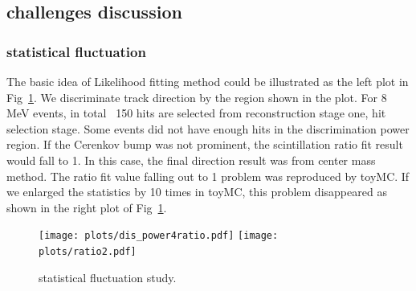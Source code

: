\documentclass[a4paper,10pt]{cpc-hepnp}
\begin{document}
\subsection{challenges discussion}
\subsubsection{statistical fluctuation}
The basic idea of Likelihood fitting method could be illustrated as the left plot
in Fig~\ref{dis_power}. We discriminate track direction by the region shown in
the plot. For 8 MeV events, in total ~150 hits are selected from reconstruction
stage one, hit selection stage. Some events did not have enough hits in the discrimination power
region. If the Cerenkov bump was not prominent, the scintillation ratio fit
result would fall to 1. In this case, the final direction result was from center mass
method. The ratio fit value falling out to 1 problem  was reproduced by toyMC. If we
enlarged the statistics by 10 times in toyMC, this problem disappeared as shown
in the right plot of Fig~\ref{dis_power}.
\begin{figure}[htbp]
\centering %
\texttt{[image: plots/dis\_power4ratio.pdf]}
\texttt{[image: plots/ratio2.pdf]}
\caption{\label{dis_power} statistical fluctuation study.}
\end{figure}
\end{document}
